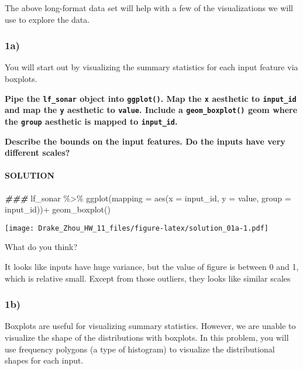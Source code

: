 \documentclass[
]{article}
\newenvironment{Shaded}{\begin{snugshade}}{\end{snugshade}}
\newcommand{\AttributeTok}[1]{\textcolor[rgb]{0.77,0.63,0.00}{#1}}
\newcommand{\DocumentationTok}[1]{\textcolor[rgb]{0.56,0.35,0.01}{\textbf{\textit{#1}}}}
\newcommand{\FunctionTok}[1]{\textcolor[rgb]{0.00,0.00,0.00}{#1}}
\newcommand{\NormalTok}[1]{#1}
\newcommand{\SpecialCharTok}[1]{\textcolor[rgb]{0.00,0.00,0.00}{#1}}
\begin{document}
The above long-format data set will help with a few of the
visualizations we will use to explore the data.

\hypertarget{a}{%
\subsubsection{1a)}\label{a}}

You will start out by visualizing the summary statistics for each input
feature via boxplots.

\textbf{Pipe the \texttt{lf\_sonar} object into \texttt{ggplot()}. Map
the \texttt{x} aesthetic to \texttt{input\_id} and map the \texttt{y}
aesthetic to \texttt{value}. Include a \texttt{geom\_boxplot()} geom
where the \texttt{group} aesthetic is mapped to \texttt{input\_id}.}

\textbf{Describe the bounds on the input features. Do the inputs have
very different scales?}

\hypertarget{solution}{%
\paragraph{SOLUTION}\label{solution}}

\begin{Shaded}
\begin{Highlighting}[]
\DocumentationTok{\#\#\#}
\NormalTok{lf\_sonar }\SpecialCharTok{\%\textgreater{}\%}
  \FunctionTok{ggplot}\NormalTok{(}\AttributeTok{mapping =} \FunctionTok{aes}\NormalTok{(}\AttributeTok{x =}\NormalTok{ input\_id, }\AttributeTok{y =}\NormalTok{ value, }\AttributeTok{group =}\NormalTok{ input\_id))}\SpecialCharTok{+}
  \FunctionTok{geom\_boxplot}\NormalTok{()}
\end{Highlighting}
\end{Shaded}

\texttt{[image: Drake\_Zhou\_HW\_11\_files/figure-latex/solution\_01a-1.pdf]}

What do you think?

It looks like inputs have huge variance, but the value of figure is
between 0 and 1, which is relative small. Except from those outliers,
they looks like similar scales

\hypertarget{b}{%
\subsubsection{1b)}\label{b}}

Boxplots are useful for visualizing summary statistics. However, we are
unable to visualize the shape of the distributions with boxplots. In
this problem, you will use frequency polygons (a type of histogram) to
visualize the distributional shapes for each input.
\end{document}
